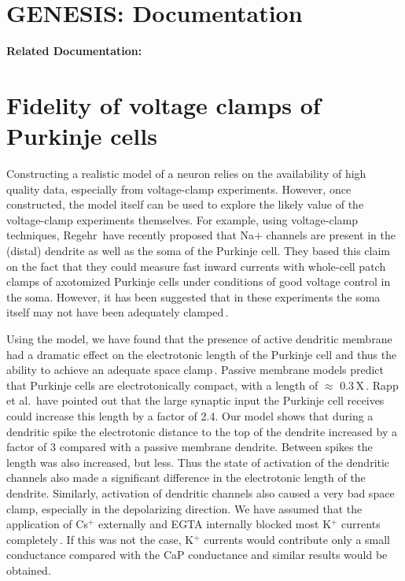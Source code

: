 \documentclass[12pt]{article}
\begin{document}
\section*{GENESIS: Documentation}

{\bf Related Documentation:}

\section*{Fidelity of voltage clamps of Purkinje cells}

Constructing a realistic
model of a neuron relies on the availability of high quality
data, especially from voltage-clamp experiments. However,
once constructed, the model itself can be used to explore
the likely value of the voltage-clamp experiments themselves.
For example, using voltage-clamp techniques, Regehr\,\cite{Regehr:1992tg} have recently proposed that Na+ channels
are present in the (distal) dendrite as well as the soma of the
Purkinje cell. They based this claim on the fact that they
could measure fast inward currents with whole-cell patch
clamps of axotomized Purkinje cells under conditions of
good voltage control in the soma. However, it has been
suggested that in these experiments the soma itself may not
have been adequately clamped\,\cite{Sugimori:1992hc}.

Using the model, we have found that the presence of
active dendritic membrane had a dramatic effect on the
electrotonic length of the Purkinje cell and thus the ability
to achieve an adequate space clamp\,\cite{Rall:1985ys}.
Passive membrane models predict that Purkinje cells are
electrotonically compact, with a length of $\approx$ 0.3\,X\,\cite{P:1985mb}. 
Rapp et al.\,\cite{Rapp-M:1992kx} have pointed out that the large
synaptic input the Purkinje cell receives could increase this
length by a factor of 2.4. Our model shows that during a
dendritic spike the electrotonic distance to the top of the
dendrite increased by a factor of 3 compared with a passive
membrane dendrite. Between spikes the length was also increased,
but less. Thus the state of activation of the dendritic
channels also made a significant difference in the
electrotonic length of the dendrite. Similarly, activation of
dendritic channels also caused a very bad space clamp, especially
in the depolarizing direction. We have assumed that
the application of Cs$^+$ externally and EGTA internally
blocked most K$^+$ currents completely\,\cite{Hille:1991zr}. If this
was not the case, K$^+$ currents would contribute only a small
conductance compared with the CaP conductance and similar
results would be obtained.
\end{document}
